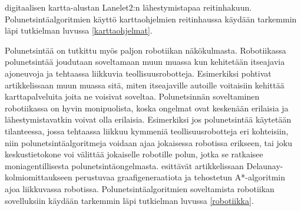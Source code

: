 digitaalisen kartta-alustan Lanelet2:n lähestymistapaa reitinhakuun. 
Polunetsintäalgoritmien käyttö karttaohjelmien reitinhaussa käydään tarkemmin 
läpi tutkielman luvussa \ref{karttaohjelmat}. \par
	Polunetsintää on tutkittu myös paljon robotiikan näkökulmasta. 
Robotiikassa polunetsintää joudutaan soveltamaan muun muassa kun 
kehitetään itseajavia ajoneuvoja ja tehtaassa liikkuvia 
teollisuusrobotteja.\cite{arXivMAPF} Esimerkiksi \textcite{Lanelet2} 
pohtivat artikkelissaan muun muassa sitä, miten itseajaville autoille 
voitaisiin kehittää karttapalveluita joita ne voisivat soveltaa. 
Polunetsinnän soveltaminen robotiikassa on hyvin monipuolista, koska 
ongelmat ovat keskenään erilaisia ja lähestymistavatkin voivat olla 
erilaisia. Esimerkiksi jos polunetsintää käytetään tilanteessa, jossa 
tehtaassa liikkuu kymmeniä teollisuusrobotteja eri kohteisiin, niin 
polunetsintäalgoritmeja voidaan ajaa jokaisessa robotissa erikseen, tai 
joku keskustietokone voi välittää jokaiselle robotille polun, jotka se 
ratkaisee moniagentillisesta polunetsintäongelmasta. 
\textcite{DelaunayVoronoiAStar} esittävät artikkelissaan 
Delaunay-kolmiomittaukseen perustuvaa graafigeneraatiota ja tehostetun 
A*-algoritmin ajoa liikkuvassa robotissa. Polunetsintäalgoritmien 
soveltamista robotiikan sovelluksiin käydään tarkemmin läpi tutkielman 
luvussa \ref{robotiikka}.
